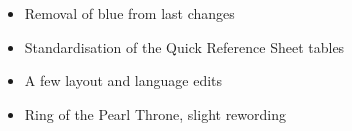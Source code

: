 
\subtitle{beta 2.1.5}

\begin{itemize}
\item Removal of blue from last changes
\item Standardisation of the Quick Reference Sheet tables
\item A few layout and language edits
\item Ring of the Pearl Throne, slight rewording
\end{itemize}
